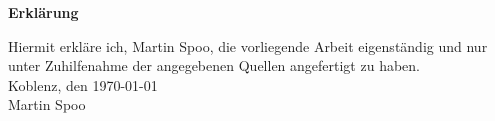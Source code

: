 \thispagestyle{empty}
\vspace*{3cm}
\begin{center}
	\Large{\textbf{Erklärung}}
\end{center}
\vspace*{1cm}
Hiermit erkläre ich, Martin Spoo, die vorliegende Arbeit eigenständig und nur unter Zuhilfenahme der angegebenen Quellen angefertigt zu haben.
\vspace*{1cm}\\
Koblenz, den \today
\vspace*{0.75cm}\\
Martin Spoo
\restoregeometry
